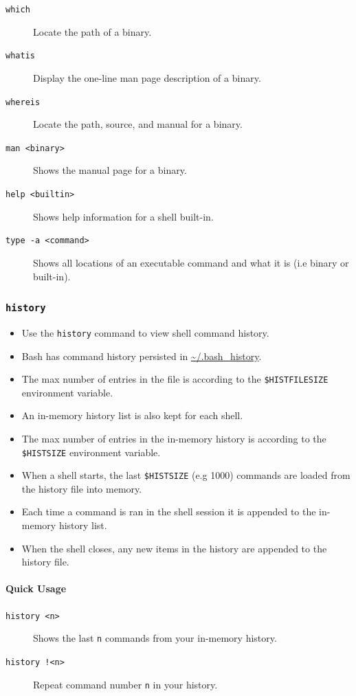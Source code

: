 \documentclass{article}
\newcommand{\code}[1]{\texttt{#1}}
\begin{document}
\begin{description}
    \item[\code{which}] Locate the path of a binary.
    \item[\code{whatis}] Display the one-line man page description of a binary.
    \item[\code{whereis}] Locate the path, source, and manual for a binary.
    \item[\code{man <binary>}] Shows the manual page for a binary.
    \item[\code{help <builtin>}] Shows help information for a shell built-in.
    \item[\code{type -a <command>}] Shows all locations of an executable command and what it is (i.e binary or built-in).
\end{description}

\subsubsection{\code{history}}

\begin{itemize}
    \item Use the \code{history} command to view shell command history.
    \item Bash has command history persisted in \url{~/.bash_history}.
    \item The max number of entries in the file is according to the \code{\$HISTFILESIZE} environment variable.
    \item An in-memory history list is also kept for each shell.
    \item The max number of entries in the in-memory history is according to the \code{\$HISTSIZE} environment variable.
    \item When a shell starts, the last \code{\$HISTSIZE} (e.g 1000) commands are loaded from the history file into memory.
    \item Each time a command is ran in the shell session it is appended to the in-memory history list.
    \item When the shell closes, any new items in the history are appended to the history file.
\end{itemize}

\paragraph{Quick Usage}

\begin{description}
    \item[\code{history <n>}] Shows the last \code{n} commands from your in-memory history.
    \item[\code{history !<n>}] Repeat command number \code{n} in your history.
\end{description}
\end{document}

